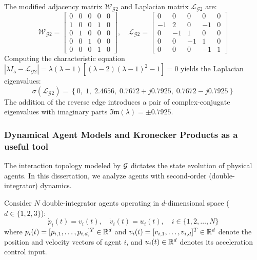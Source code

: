 \begin{example}
The modified adjacency matrix $\mathcal{W}_{\mathcal{G}2}$ and Laplacian matrix $\mathcal{L}_{\mathcal{G}2}$ are:
\begin{equation*}
\mathcal{W}_{\mathcal{G}2} = \begin{bmatrix} 
0 & 0 & 0 & 0 & 0 \\ 
1 & 0 & 0 & 1 & 0 \\ 
0 & 1 & 0 & 0 & 0 \\ 
0 & 0 & 1 & 0 & 0 \\ 
0 & 0 & 0 & 1 & 0 
\end{bmatrix}, \quad
\mathcal{L}_{\mathcal{G}2} = \begin{bmatrix} 
0 & 0 & 0 & 0 & 0 \\ 
-1 & 2 & 0 & -1 & 0 \\ 
0 & -1 & 1 & 0 & 0 \\ 
0 & 0 & -1 & 1 & 0 \\ 
0 & 0 & 0 & -1 & 1 
\end{bmatrix}
\end{equation*}
Computing the characteristic equation $|\lambda I_5 - \mathcal{L}_{\mathcal{G}2}| = \lambda (\lambda - 1) [(\lambda - 2)(\lambda - 1)^2 - 1] = 0$ yields the Laplacian eigenvalues:
\begin{equation*}
\sigma(\mathcal{L}_{\mathcal{G}2}) = \left\{ 0, \; 1, \; 2.4656, \; 0.7672 + j 0.7925, \; 0.7672 - j 0.7925 \right\}
\end{equation*}
The addition of the reverse edge introduces a pair of complex-conjugate eigenvalues with imaginary parts $\mathfrak{Im}(\lambda) = \pm 0.7925$.
\end{example}

\subsubsection{Dynamical Agent Models and Kronecker Products as a useful tool}
The interaction topology modeled by $\mathcal{G}$ dictates the state evolution of physical agents. In this dissertation, we analyze agents with second-order (double-integrator) dynamics.

Consider $N$ double-integrator agents operating in $d$-dimensional space ($d \in \{1, 2, 3\}$):
\begin{equation}\label{eq:double_integrator_model}
    \dot{p}_i(t) = v_i(t), \quad \dot{v}_i(t) = u_i(t), \quad i \in \{1, 2, \dots, N\}
\end{equation}
where $p_i(t) = [p_{i,1}, \dots, p_{i,d}]^T \in \mathbb{R}^d$ and $v_i(t) = [v_{i,1}, \dots, v_{i,d}]^T \in \mathbb{R}^d$ denote the position and velocity vectors of agent $i$, and $u_i(t) \in \mathbb{R}^d$ denotes its acceleration control input.

